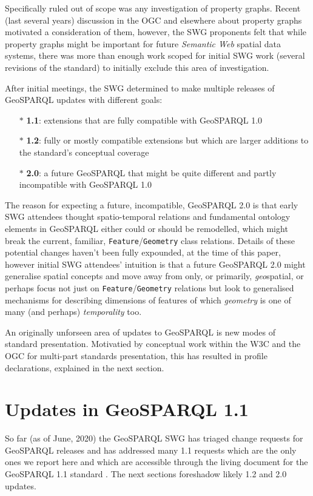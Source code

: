 \documentclass[runningheads]{llncs}
\begin{document}
Specifically ruled out of scope was any investigation of property graphs. Recent (last several years) discussion in the OGC and 
elsewhere about property graphs motivated a consideration of them, however, the SWG proponents felt that while property graphs might 
be important for future \textit{Semantic Web} spatial data systems, there was more than enough work scoped for initial SWG work
(several revisions of the standard) to initially exclude this area of investigation.

After initial meetings, the SWG determined to make multiple releases of GeoSPARQL updates with different goals:

\begin{itemize}
    \item[$\ast$] \textbf{1.1}: extensions that are fully compatible with GeoSPARQL 1.0
    \item[$\ast$] \textbf{1.2}: fully or mostly compatible extensions but which are larger additions to the standard's conceptual coverage
    \item[$\ast$] \textbf{2.0}: a future GeoSPARQL that might be quite different and partly incompatible with GeoSPARQL 1.0
\end{itemize} 

The reason for expecting a future, incompatible, GeoSPARQL 2.0 is that early SWG attendees thought spatio-temporal relations
and fundamental ontology elements in GeoSPARQL either could or should be remodelled, which might break the current, familiar, 
\texttt{Feature}/\texttt{Geometry} class relations. Details of these potential changes haven't been fully expounded, at the 
time of this paper, however initial SWG attendees' intuition is that a future GeoSPARQL 2.0 might generalise spatial concepts and
move away from only, or primarily, \textit{geo}spatial, or perhaps focus not just on \texttt{Feature}/\texttt{Geometry} relations
but look to generalised mechanisms for describing dimensions of features of which \textit{geometry} is one of many (and perhaps)
\textit{temporality} too.

An originally unforseen area of updates to GeoSPARQL is new modes of standard presentation. Motivatied by conceptual work within the W3C and the OGC for  
multi-part standards presentation, this has resulted in profile declarations, explained 
in the next section.


\section{Updates in GeoSPARQL 1.1}\label{sec:newfeatures}
So far (as of June, 2020) the GeoSPARQL SWG has triaged change requests for GeoSPARQL releases and has addressed
many 1.1 requests which are the only ones we report here and which are accessible through the living document for the GeoSPARQL 1.1 standard \cite{ogcgeosparql11}. The next sections foreshadow likely 1.2 and 2.0 updates.
\end{document}
